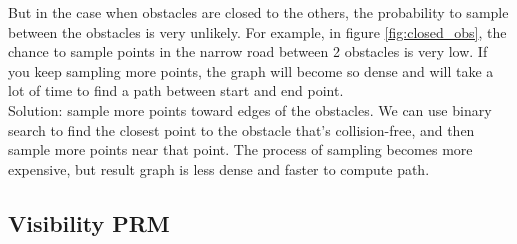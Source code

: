 \documentclass[11pt]{article}
\begin{document}
But in the case when obstacles are closed to the others, the probability to sample between the obstacles is very unlikely. For example, in figure \ref{fig:closed_obs}, the chance to sample points in the narrow road between 2 obstacles is very low. If you keep sampling more points, the graph will become so dense and will take a lot of time to find a path between start and end point.\\
Solution: sample more points toward edges of the obstacles. We can use binary search to find the closest point to the obstacle that's collision-free, and then sample more points near that point. The process of sampling becomes more expensive, but result graph is less dense and faster to compute path.

\subsection{Visibility PRM}
\end{document}
